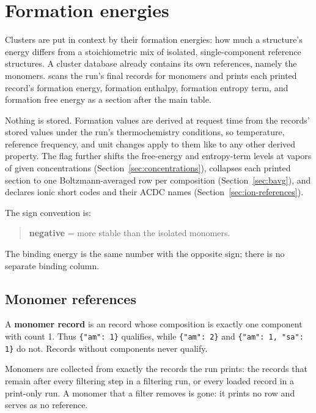 \section{Formation energies}\label{sec:formation}

Clusters are put in context by their formation energies: how much a
structure's energy differs from a stoichiometric mix of isolated,
single-component reference structures. A cluster database already contains
its own references, namely the monomers. \CJKQC{} scans the run's final
records for monomers and prints each printed record's formation energy,
formation enthalpy, formation entropy term, and formation free energy as a
section after the main table.

Nothing is stored. Formation values are derived at request time from the
records' stored values under the run's thermochemistry conditions, so
temperature, reference frequency, and unit changes apply to them like to any
other derived property. The  flag further shifts the
free-energy and entropy-term levels at vapors of given concentrations
(Section~\ref{sec:concentrations}),  collapses each printed
section to one Boltzmann-averaged row per composition
(Section~\ref{sec:bavg}), and  declares ionic short codes and
their ACDC names (Section~\ref{sec:ion-references}).

The sign convention is:

\begin{quote}
\textbf{negative} = more stable than the isolated monomers.
\end{quote}

The binding energy is the same number with the opposite sign; there is no
separate binding column.

\subsection{Monomer references}\label{sec:monomer-references}

A \textbf{monomer record} is an  record whose composition is exactly
one component with count 1. Thus \texttt{\{"am": 1\}} qualifies, while
\texttt{\{"am": 2\}} and \texttt{\{"am": 1, "sa": 1\}} do not. Records
without components never qualify.

Monomers are collected from exactly the records the run prints: the records
that remain after every filtering step in a filtering run, or every loaded
record in a print-only run. A monomer that a filter removes is gone:
it prints no row and serves as no reference.

